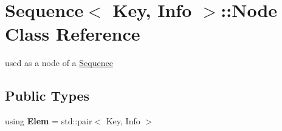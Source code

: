 \hypertarget{structSequence_1_1Node}{}\section{Sequence$<$ Key, Info $>$\+::Node Class Reference}
\label{structSequence_1_1Node}


used as a node of a \mbox{\hyperlink{structSequence}{Sequence}}  


\subsection*{Public Types}
\begin{DoxyCompactItemize}
\item 
\mbox{\label{structSequence_1_1Node_aa02027d9c7daeab43853ce84b45ef64a}} 
using {\bfseries Elem} = std\+::pair$<$ Key, Info $>$
\end{DoxyCompactItemize}
